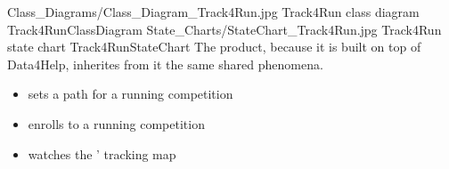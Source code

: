 \documentclass[../../rasd.tex]{subfiles}
\begin{document}
			\image {13cm} {Class_Diagrams/Class_Diagram_Track4Run.jpg} {Track4Run class diagram} {Track4RunClassDiagram}
			\image {13cm} {State_Charts/StateChart_Track4Run.jpg} {Track4Run state chart} {Track4RunStateChart}
			The product, because it is built on top of Data4Help, inherites from it the same shared phenomena.

			\begin{itemize}
				\item {} sets a path for a running competition
				\item {} enrolls to a running competition
				\item {} watches the ' tracking map			
			\end{itemize}
\end{document}
